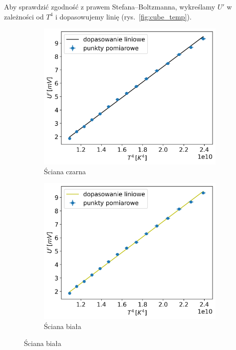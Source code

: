\documentclass[12pt]{article}
\begin{document}
Aby sprawdzić zgodność z prawem Stefana–Boltzmanna, wykreślamy $U'$ w zależności od $T^4$ i dopasowujemy linię (rys.~\ref{fig:cube_temp}).

\begin{figure}[H]
	\centering
	\begin{subfigure}{0.45\textwidth}
		\centering
		\includegraphics[width=\linewidth]{cube_black}
		\caption{Ściana czarna}
		\label{fig:cube_black}
	\end{subfigure}
	\hfill
	\begin{subfigure}{0.45\textwidth}
		\centering
		\includegraphics[width=\linewidth]{cube_white}
		\caption{Ściana biała}
		\label{fig:cube_white}
	\end{subfigure}


\end{figure}
\end{document}
